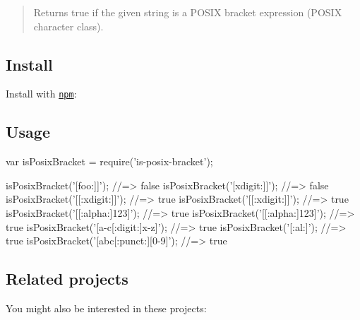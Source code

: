 \begin{quote}
Returns true if the given string is a P\+O\+S\+IX bracket expression (P\+O\+S\+IX character class). \end{quote}


\subsection*{Install}

Install with \href{https://www.npmjs.com/}{\tt npm}\+:




\subsection*{Usage}


\begin{DoxyCode}
var isPosixBracket = require('is-posix-bracket');

isPosixBracket('[foo:]]');
//=> false
isPosixBracket('[xdigit:]]');
//=> false
isPosixBracket('[[:xdigit:]]');
//=> true
isPosixBracket('[[:xdigit:]]');
//=> true
isPosixBracket('[[:alpha:]123]');
//=> true
isPosixBracket('[[:alpha:]123]');
//=> true
isPosixBracket('[a-c[:digit:]x-z]');
//=> true
isPosixBracket('[:al:]');
//=> true
isPosixBracket('[abc[:punct:][0-9]');
//=> true
\end{DoxyCode}


\subsection*{Related projects}

You might also be interested in these projects\+:


